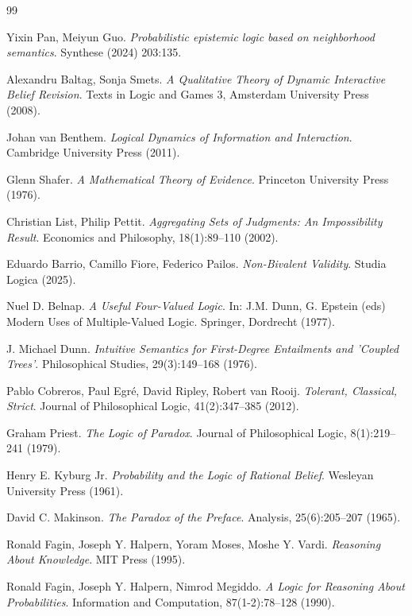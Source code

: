 \documentclass[11pt,a4paper]{article}
\begin{document}
\begin{thebibliography}{99}

Yixin Pan, Meiyun Guo.
\textit{Probabilistic epistemic logic based on neighborhood semantics}.
Synthese (2024) 203:135.

Alexandru Baltag, Sonja Smets.
\textit{A Qualitative Theory of Dynamic Interactive Belief Revision}.
Texts in Logic and Games 3, Amsterdam University Press (2008).

Johan van Benthem.
\textit{Logical Dynamics of Information and Interaction}.
Cambridge University Press (2011).

Glenn Shafer.
\textit{A Mathematical Theory of Evidence}.
Princeton University Press (1976).

Christian List, Philip Pettit.
\textit{Aggregating Sets of Judgments: An Impossibility Result}.
Economics and Philosophy, 18(1):89--110 (2002).

Eduardo Barrio, Camillo Fiore, Federico Pailos.
\textit{Non-Bivalent Validity}.
Studia Logica (2025).

Nuel D. Belnap.
\textit{A Useful Four-Valued Logic}.
In: J.M. Dunn, G. Epstein (eds) Modern Uses of Multiple-Valued Logic. Springer, Dordrecht (1977).

J. Michael Dunn.
\textit{Intuitive Semantics for First-Degree Entailments and 'Coupled Trees'}.
Philosophical Studies, 29(3):149--168 (1976).

Pablo Cobreros, Paul Egré, David Ripley, Robert van Rooij.
\textit{Tolerant, Classical, Strict}.
Journal of Philosophical Logic, 41(2):347--385 (2012).

Graham Priest.
\textit{The Logic of Paradox}.
Journal of Philosophical Logic, 8(1):219--241 (1979).

Henry E. Kyburg Jr.
\textit{Probability and the Logic of Rational Belief}.
Wesleyan University Press (1961).

David C. Makinson.
\textit{The Paradox of the Preface}.
Analysis, 25(6):205--207 (1965).

Ronald Fagin, Joseph Y. Halpern, Yoram Moses, Moshe Y. Vardi.
\textit{Reasoning About Knowledge}.
MIT Press (1995).

Ronald Fagin, Joseph Y. Halpern, Nimrod Megiddo.
\textit{A Logic for Reasoning About Probabilities}.
Information and Computation, 87(1-2):78--128 (1990).


\end{thebibliography}
\end{document}
